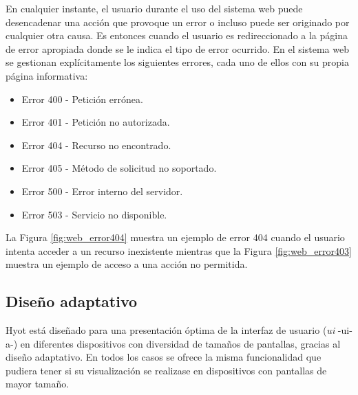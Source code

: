 \documentclass[12pt,a4paper, twoside]{report}
\begin{document}
	En cualquier instante, el usuario durante el uso del sistema web puede desencadenar una acción que provoque un error o incluso puede ser originado por cualquier otra causa. Es entonces cuando el usuario es redireccionado a la página de error apropiada donde se le indica el tipo de error ocurrido. En el sistema web se gestionan explícitamente los siguientes errores, cada uno de ellos con su propia página informativa:
	
	 \begin{itemize}
	 	\item Error 400 - Petición errónea.
	 	\item Error 401 - Petición no autorizada.
	 	\item Error 404 - Recurso no encontrado.
	 	\item Error 405 - Método de solicitud no soportado.
	 	\item Error 500 - Error interno del servidor.
	 	\item Error 503 - Servicio no disponible.
	 \end{itemize}
	
	La Figura \ref{fig:web_error404} muestra un ejemplo de error 404 cuando el usuario intenta acceder a un recurso inexistente mientras que la Figura \ref{fig:web_error403} muestra un ejemplo de acceso a una acción no permitida.
	
	
	

	\subsection{Diseño adaptativo}
	
	Hyot está diseñado para una presentación óptima de la interfaz de usuario (\textit{\gls{ui}} -\gls{ui-a}-) en diferentes dispositivos con diversidad de tamaños de pantallas, gracias al diseño adaptativo. En todos los casos se ofrece la misma funcionalidad que pudiera tener si su visualización se realizase en dispositivos con pantallas de mayor tamaño. \\
	
\end{document}
